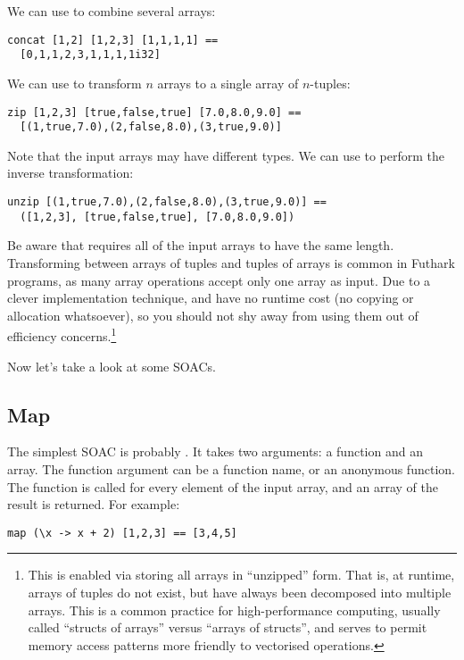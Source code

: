 \documentclass[oneside,11pt]{book}
\begin{document}
We can use  to combine several arrays:

\begin{lstlisting}
concat [1,2] [1,2,3] [1,1,1,1] ==
  [0,1,1,2,3,1,1,1,1i32]
\end{lstlisting}

We can use  to transform $n$ arrays to a single array of
$n$-tuples:

\begin{lstlisting}
zip [1,2,3] [true,false,true] [7.0,8.0,9.0] ==
  [(1,true,7.0),(2,false,8.0),(3,true,9.0)]
\end{lstlisting}

Note that the input arrays may have different types.  We can use
 to perform the inverse transformation:

\begin{lstlisting}
unzip [(1,true,7.0),(2,false,8.0),(3,true,9.0)] ==
  ([1,2,3], [true,false,true], [7.0,8.0,9.0])
\end{lstlisting}

Be aware that  requires all of the input arrays to have the
same length.  Transforming between arrays of tuples and tuples of
arrays is common in Futhark programs, as many array operations accept
only one array as input.  Due to a clever implementation technique,
 and  have no runtime cost (no copying or
allocation whatsoever), so you should not shy away from using them out
of efficiency concerns.\footnote{This is enabled via storing all
  arrays in ``unzipped'' form.  That is, at runtime, arrays of tuples
  do not exist, but have always been decomposed into multiple arrays.
  This is a common practice for high-performance computing, usually
  called ``structs of arrays'' versus ``arrays of structs'', and
  serves to permit memory access patterns more friendly to vectorised
  operations.}

Now let's take a look at some SOACs.

\subsection{Map}

The simplest SOAC is probably .  It takes two arguments: a
function and an array.  The function argument can be a function name,
or an anonymous function.  The function is
called for every element of the input array, and an array of the result is
returned.  For example:

\begin{lstlisting}
map (\x -> x + 2) [1,2,3] == [3,4,5]
\end{lstlisting}
\end{document}
